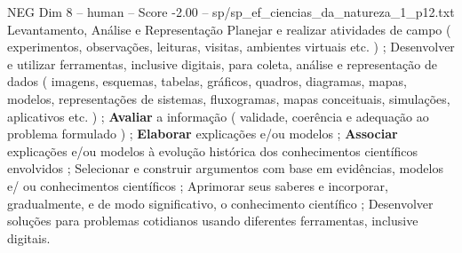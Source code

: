 \begin{textsample}{NEG Dim 8 – human – Score -2.00 – sp/sp\_ef\_ciencias\_da\_natureza\_1\_p12.txt}  \label{ex:f8_neg_001}
Levantamento, Análise e Representação Planejar e realizar atividades de campo ( experimentos, observações, leituras, visitas, ambientes virtuais etc. ) ; Desenvolver e utilizar ferramentas, inclusive digitais, para coleta, análise e representação de dados ( imagens, esquemas, tabelas, gráficos, quadros, diagramas, mapas, modelos, representações de sistemas, fluxogramas, mapas conceituais, simulações, aplicativos etc. ) ; \textbf{Avaliar} a informação ( validade, coerência e adequação ao problema formulado ) ; \textbf{Elaborar} explicações e/ou modelos ; \textbf{Associar} explicações e/ou modelos à evolução histórica dos conhecimentos científicos envolvidos ; Selecionar e construir argumentos com base em evidências, modelos e/ ou conhecimentos científicos ; Aprimorar seus saberes e incorporar, gradualmente, e de modo significativo, o conhecimento científico ; Desenvolver soluções para problemas cotidianos usando diferentes ferramentas, inclusive digitais.

\end{textsample}
